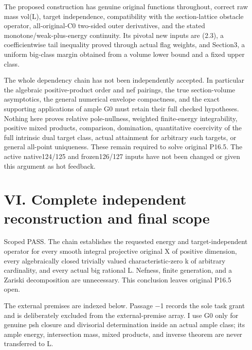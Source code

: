 \documentclass[
  10pt,
]{article}
\begin{document}
The proposed construction has genuine original functions throughout,
correct raw mass vol(L), target independence, compatibility with the
section-lattice obstacle operator, all-original-C0 two-sided outer
derivatives, and the stated monotone/weak-plus-energy continuity. Its
pivotal new inputs are (2.3), a coefficientwise tail inequality proved
through actual flag weights, and Section3, a uniform big-class margin
obtained from a volume lower bound and a fixed upper class.

The whole dependency chain has not been independently accepted. In
particular the algebraic positive-product order and nef pairings, the
true section-volume asymptotics, the general numerical envelope
compactness, and the exact supporting applications of ample G0 must
retain their full checked hypotheses. Nothing here proves relative
pole-nullness, weighted finite-energy integrability, positive mixed
products, comparison, domination, quantitative coercivity of the full
intrinsic dual target class, actual attainment for arbitrary such
targets, or general all-point uniqueness. These remain required to solve
original P16.5. The active native124/125 and frozen126/127 inputs have
not been changed or given this argument as hot feedback.

\section{VI. Complete independent reconstruction and final
scope}\label{vi.-complete-independent-reconstruction-and-final-scope}

Scoped PASS. The chain establishes the requested energy and
target-independent operator for every smooth integral projective
original X of positive dimension, every algebraically closed trivially
valued characteristic-zero k of arbitrary cardinality, and every actual
big rational L. Nefness, finite generation, and a Zariski decomposition
are unnecessary. This conclusion leaves original P16.5 open.

The external premises are indexed below. Passage −1 records the sole
task grant and is deliberately excluded from the external-premise array.
I use G0 only for genuine psh closure and divisorial determination
inside an actual ample class; its ample energy, intersection mass, mixed
products, and inverse theorem are never transferred to L.
\end{document}
